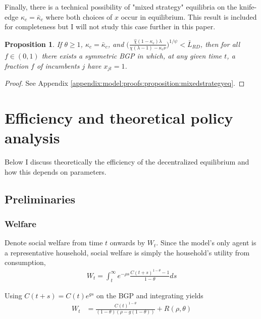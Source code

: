 \documentclass[11pt,english]{article}
\newtheorem{proposition}{Proposition}
\begin{document}
Finally, there is a technical possibility of "mixed strategy" equilibria on the knife-edge $\kappa_c = \bar{\kappa}_c$ where both choices of $x$ occur in equilibrium. This result is included for completeness but I will not study this case further in this paper.

\begin{proposition}\label{proposition:mixedstrategyeq}
	If $\theta \ge 1$, $\kappa_c = \bar{\kappa}_c$, and $\Big( \frac{\hat{\chi} (1-\kappa_{e}) \lambda}{\chi(\lambda-1) - \kappa_{c} \nu} \Big)^{1/\psi} < \bar{L}_{RD}$, then for all $f \in (0,1)$ there exists a symmetric BGP in which, at any given time $t$, a fraction $f$ of incumbents $j$ have $x_{jt} = 1$.  
\end{proposition}

\begin{proof}
	See Appendix \ref{appendix:model:proofs:proposition:mixedstrategyeq}.
\end{proof}


\section{Efficiency and theoretical policy analysis}\label{model:efficiency:efficiency}

Below I discuss theoretically the efficiency of the decentralized equilibrium and how this depends on parameters. 

\subsection{Preliminaries}

\subsubsection{Welfare}

Denote social welfare from time $t$ onwards by $W_t$. Since the model's only agent is a representative household, social welfare is simply the household's utility from consumption,
\begin{align}
	W_t = \int_t^{\infty} e^{-\rho s} \frac{C(t+s)^{1-\theta} - 1}{1-\theta} ds \label{eq:agg_welfare0}
\end{align}

Using $C(t+s) = C(t) e^{gs}$ on the BGP and integrating yields
\begin{align}
	W_t &= \frac{C(t)^{1-\theta} }{(1-\theta)(\rho - g(1-\theta))} + R(\rho,\theta)
\end{align}
\end{document}
